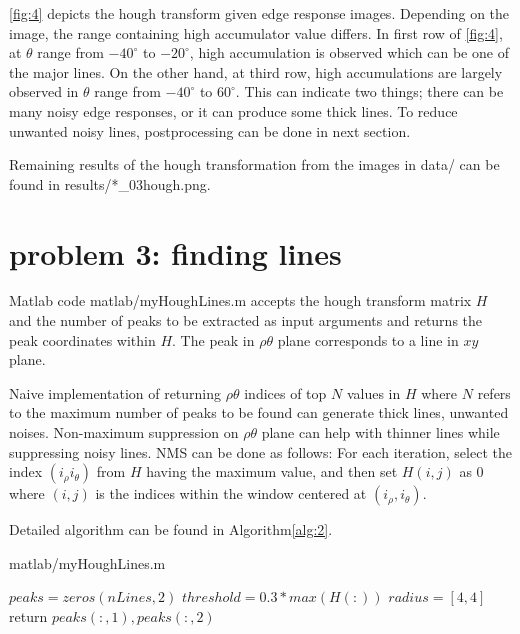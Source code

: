 \documentclass[extendedabs]{bmvc2k}
\begin{document}
\figurename{\ref{fig:4}} depicts the hough transform given edge response images. Depending on the image, the range
containing high accumulator value differs. In first row of \figurename{\ref{fig:4}}, at $\theta$ range from $-40^\circ$ to $-20^\circ$, high accumulation
is observed which can be one of the major lines. On the other hand, at third row, high accumulations are largely observed
in $\theta$ range from $-40^\circ$ to $60^\circ$. This can indicate two things; there can be many noisy edge responses, or
it can produce some thick lines. To reduce unwanted noisy lines, postprocessing can be done in next section.

Remaining results of the hough transformation from the images in data/ can be found in
results/*\_03hough.png. 

\section*{problem 3: finding lines}

Matlab code matlab/myHoughLines.m accepts the hough transform matrix $H$ and the number of peaks to be extracted as input
arguments and returns the peak coordinates within $H$. The peak in $\rho\theta$ plane corresponds to a line in $xy$ plane.

Naive implementation of returning $\rho\theta$ indices of top $N$ values in $H$ where $N$ refers to the maximum number of
peaks to be found can generate thick lines, unwanted noises. Non-maximum suppression on $\rho\theta$ plane can help with
thinner lines while suppressing noisy lines. NMS can be done as follows: For each iteration, select the index 
$(i_{\rho} i_{\theta})$ from $H$ having the maximum value, and then set $H(i, j)$ as $0$ where $(i, j)$ is the indices 
within the window centered at $(i_{\rho}, i_{\theta})$.

Detailed algorithm can be found in Algorithm\ref{alg:2}.

\begin{algorithm}
    \caption{matlab/myHoughLines.m}
    \label{alg:2}
    $peaks = zeros(nLines, 2)$\;
    $threshold = 0.3 * max(H(:))$\;
    $radius = [4, 4]$\;
    return $peaks(:, 1), peaks(:, 2)$\;
\end{algorithm}
\end{document}
